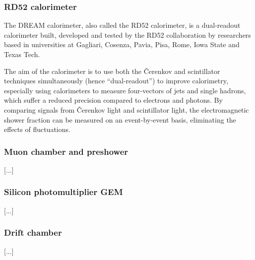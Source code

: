 \subsubsection{RD52 calorimeter} %
The \acrfull{DREAM} calorimeter, also called the RD52 calorimeter, is a dual-readout calorimeter built, developed and tested by the RD52 collaboration by researchers based in universities at Gagliari, Cosenza, Pavia, Pisa, Rome, Iowa State and Texas Tech. 

The aim of the calorimeter is to use both the \v{C}erenkov and scintillator techniques simultaneously (hence ``dual-readout'') to improve calorimetry, especially using calorimeters to measure four-vectors of jets and single hadrons, which suffer a reduced precision compared to electrons and photons. By comparing signals from \v{C}erenkov light and scintillator light, the electromagnetic shower fraction can be measured on an event-by-event basis, eliminating the effects of fluctuations. %


\subsubsection{Muon chamber and preshower}
[...]



\subsubsection{Silicon photomultiplier GEM}
[...]

\subsubsection{Drift chamber}
[...]


